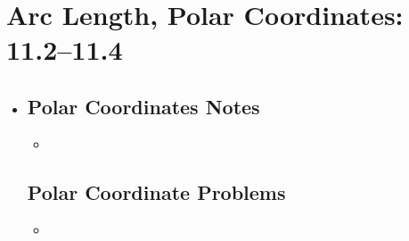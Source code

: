 \section{Arc Length, Polar Coordinates: 11.2--11.4}
\begin{itemize}
  \item

  \subsection{Polar Coordinates Notes}
  \begin{itemize}
    \item
  \end{itemize}

  \subsection{Polar Coordinate Problems}
  \begin{itemize}
    \item
  \end{itemize}

\end{itemize}
